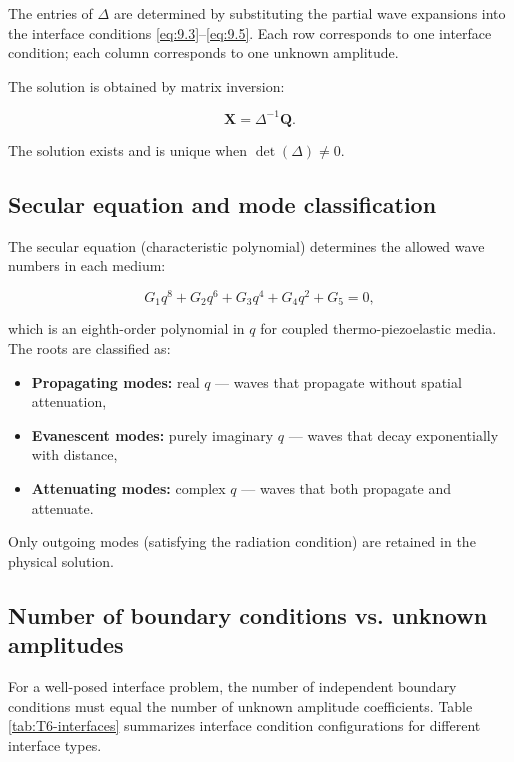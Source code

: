 The entries of $\Delta$ are determined by substituting the partial wave expansions into the interface conditions \eqref{eq:9.3}--\eqref{eq:9.5}. Each row corresponds to one interface condition; each column corresponds to one unknown amplitude.

The solution is obtained by matrix inversion:

\begin{equation}
\bm{X} = \Delta^{-1}\bm{Q}.
\label{eq:9.8}
\end{equation}

The solution exists and is unique when $\det(\Delta) \neq 0$.

\subsection{Secular equation and mode classification}
\label{sec:9.5}

The secular equation (characteristic polynomial) determines the allowed wave numbers in each medium:

\begin{equation}
G_1 q^8 + G_2 q^6 + G_3 q^4 + G_4 q^2 + G_5 = 0,
\label{eq:9.9}
\end{equation}

which is an eighth-order polynomial in $q$ for coupled thermo-piezoelastic media. The roots are classified as:

\begin{itemize}
\item \textbf{Propagating modes:} real $q$ --- waves that propagate without spatial attenuation,
\item \textbf{Evanescent modes:} purely imaginary $q$ --- waves that decay exponentially with distance,
\item \textbf{Attenuating modes:} complex $q$ --- waves that both propagate and attenuate.
\end{itemize}

Only outgoing modes (satisfying the radiation condition) are retained in the physical solution.

\subsection{Number of boundary conditions vs. unknown amplitudes}
\label{sec:9.6}

For a well-posed interface problem, the number of independent boundary conditions must equal the number of unknown amplitude coefficients. Table \ref{tab:T6-interfaces} summarizes interface condition configurations for different interface types.

